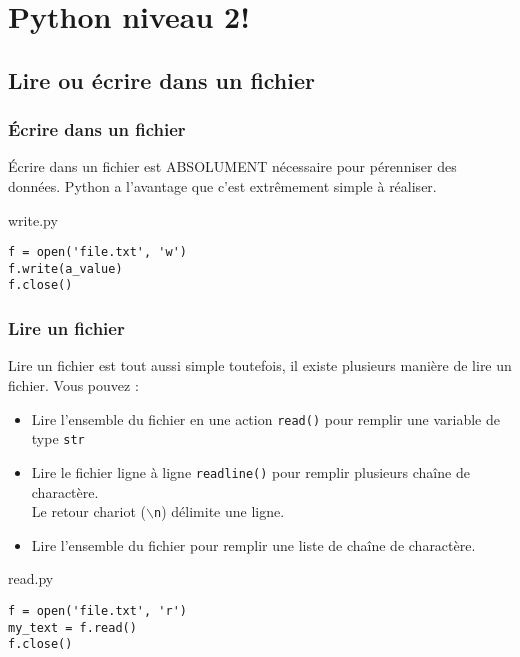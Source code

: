 \section{Python niveau 2!}


\subsection{Lire ou écrire dans un fichier}

\subsubsection{Écrire dans un fichier}

Écrire dans un fichier est ABSOLUMENT nécessaire pour pérenniser des données.
Python a l'avantage que c'est extrêmement simple à réaliser.



\vskip 2pt
\begin{center}
  \begin{myterminalbox}[colback=gray!10]{write.py}
\begin{verbatim}
f = open('file.txt', 'w')
f.write(a_value)
f.close()
\end{verbatim}
  \end{myterminalbox}
\end{center}

\subsubsection{Lire un fichier }

Lire un fichier est tout aussi simple toutefois, il existe plusieurs manière de lire un fichier.
Vous pouvez :
\begin{itemize}
\item Lire l'ensemble du fichier en une action \texttt{read()} pour remplir une variable de type \texttt{str}
\item Lire le fichier ligne à ligne \texttt{readline()} pour remplir plusieurs chaîne de charactère.\\
  Le retour chariot (\texttt{$\backslash$n}) délimite une ligne.
\item Lire l'ensemble du fichier pour remplir une liste de chaîne de charactère.
\end{itemize}


\vskip 2pt
\begin{center}
  \begin{myterminalbox}[colback=gray!10]{read.py}
\begin{verbatim}
f = open('file.txt', 'r')
my_text = f.read()
f.close()
\end{verbatim}
  \end{myterminalbox}
\end{center}

